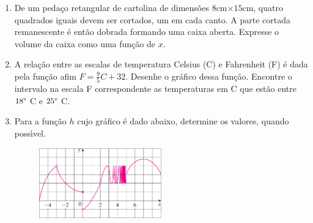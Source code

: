 \documentclass[a4paper,5pt]{amsbook}
\begin{document}
\begin{enumerate}
    \vspace{0.5cm}
    \item De um peda\c{c}o retangular de cartolina de dimens\~oes $8$cm$\times 15$cm,
        quatro quadrados iguais devem ser cortados, um em cada canto. A parte
        cortada remanescente \'e ent\~ao dobrada formando uma caixa aberta.
        Expresse o volume da caixa como uma fun\c{c}\~ao de $x$.

    \vspace{0.5cm}
    \item A rela\c{c}\~ao entre as escalas de temperatura Celsius (C) e Fahrenheit
        (F) \'e dada pela fun\c{c}\~ao afim $F=\displaystyle\frac{9}{5}C+32$. Desenhe o
        gr\'afico dessa fun\c{c}\~ao. Encontre o intervalo na escala F correspondente
        as temperaturas em C que est\~ao entre $18\degree$ C e $25\degree$ C.

    \newpage
    \vspace{0.5cm}
    \item Para a fun\c{c}\~ao $h$ cujo gr\'afico \'e dado abaixo, determine os valores,
        quando poss\'{\i}vel.

        \begin{figure}[!h]
            \centering
            \includegraphics[width=0.5\textwidth]{lista-00-fig2.png}
        \end{figure}


\end{enumerate}
\end{document}
